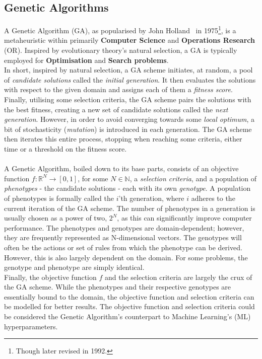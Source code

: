 \subsection{Genetic Algorithms}\label{sec:genetic-algorithms}
A Genetic Algorithm (GA), as popularised by John Holland~\cite{Genetic-Algorithm-original} in 1975\footnote{Though later revised in 1992.}, is a metaheuristic within primarily \textbf{Computer Science} and \textbf{Operations Research} (OR). Inspired by evolutionary theory's natural selection, a GA is typically employed for \textbf{Optimisation} and \textbf{Search problems}.
\\
In short, inspired by natural selection, a GA scheme initiates, at random, a pool of \textit{candidate solutions} called the \textit{initial generation}. It then evaluates the solutions with respect to the given domain and assigns each of them a \textit{fitness score}. Finally, utilising some selection criteria, the GA scheme pairs the solutions with the best fitness, creating a new set of candidate solutions called the \textit{next generation}. However, in order to avoid converging towards some \textit{local optimum}, a bit of stochasticity (\textit{mutation}) is introduced in each generation. The GA scheme then iterates this entire process, stopping when reaching some criteria, either time or a threshold on the fitness score.
\\
\\
A Genetic Algorithm, boiled down to its base parts, consists of an objective function $f : \mathbb{R}^N \rightarrow [0,1]$, for some $N \in \mathbb{N}$, a \textit{selection criteria}, and a population of \textit{phenotypes} - the candidate solutions - each with its own \textit{genotype}. A population of phenotypes is formally called the $i$'th generation, where $i$ adheres to the current iteration of the GA scheme. The number of phenotypes in a generation is usually chosen as a power of two, $2^N$, as this can significantly improve computer performance. The phenotypes and genotypes are domain-dependent; however, they are frequently represented as N-dimensional vectors. The genotypes will often be the actions or set of rules from which the phenotype can be derived. However, this is also largely dependent on the domain. For some problems, the genotype and phenotype are simply identical.
\\
Finally, the objective function $f$ and the selection criteria are largely the crux of the GA scheme. While the phenotypes and their respective genotypes are essentially bound to the domain, the objective function and selection criteria can be modelled for better results. The objective function and selection criteria could be considered the Genetic Algorithm's counterpart to Machine Learning's (ML) hyperparameters.
